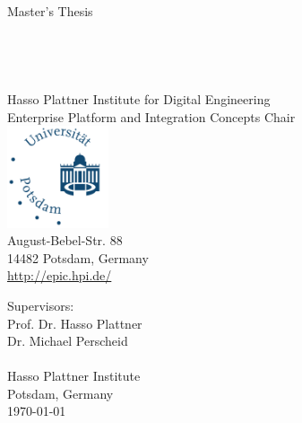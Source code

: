 \begin{titlepage}

\thispagestyle{empty}
\begin{center}
	\LARGE
	Master's Thesis\\
	\vspace{0.4cm}
	\Huge
    \TITLE{}\\
	\vspace{0.4cm}
	\large
    \SUBTITLE{}\\
	\vspace{0.5cm}
	\LARGE
	\textbf{\AUTHOR}\\
	\normalsize
  \Mail{\EMAIL}\\
	\vspace{0.4cm}
	\small
	Hasso Plattner Institute for Digital Engineering\\
	Enterprise Platform and Integration Concepts Chair\\
	\vspace{0.3cm}
	\hspace{1cm}
	\includegraphics[width=3cm]{figures/Universitaet_Potsdam_logo}\\
	\vspace{0.1cm}
	August-Bebel-Str. 88\\
	14482 Potsdam, Germany\\
	\url{http://epic.hpi.de/}\\
\end{center}
Supervisors:
\vspace{0.3cm}\\
Prof. Dr. Hasso Plattner\\
Dr. Michael Perscheid\\
\SUPERVISOR
\vspace{0.3cm}\\
Hasso Plattner Institute\\
Potsdam, Germany
\vspace{0.4cm}\\
\today
\end{titlepage}
